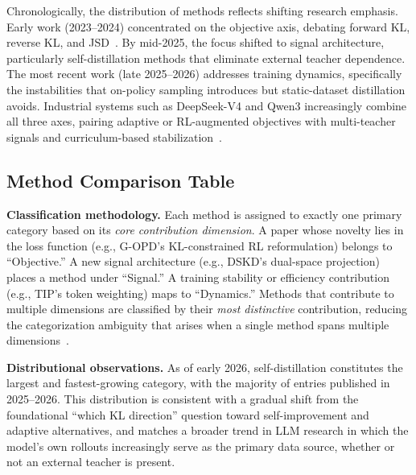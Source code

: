 \documentclass{article} %
\begin{document}
Chronologically, the distribution of methods reflects shifting research emphasis. Early work (2023--2024) concentrated on the objective axis, debating forward KL, reverse KL, and JSD~\citep{2306.13649,2306.08543}. By mid-2025, the focus shifted to signal architecture, particularly self-distillation methods that eliminate external teacher dependence. The most recent work (late 2025--2026) addresses training dynamics, specifically the instabilities that on-policy sampling introduces but static-dataset distillation avoids. Industrial systems such as DeepSeek-V4 and Qwen3 increasingly combine all three axes, pairing adaptive or RL-augmented objectives with multi-teacher signals and curriculum-based stabilization~\citep{2602.12125,2505.09388}.

\subsection{Method Comparison Table}

\textbf{Classification methodology.} Each method is assigned to exactly one primary category based on its \emph{core contribution dimension}. A paper whose novelty lies in the loss function (e.g., G-OPD's KL-constrained RL reformulation) belongs to ``Objective.'' A new signal architecture (e.g., DSKD's dual-space projection) places a method under ``Signal.'' A training stability or efficiency contribution (e.g., TIP's token weighting) maps to ``Dynamics.'' Methods that contribute to multiple dimensions are classified by their \emph{most distinctive} contribution, reducing the categorization ambiguity that arises when a single method spans multiple dimensions~\citep{2402.13116}.

\textbf{Distributional observations.} As of early 2026, self-distillation constitutes the largest and fastest-growing category, with the majority of entries published in 2025--2026. This distribution is consistent with a gradual shift from the foundational ``which KL direction'' question toward self-improvement and adaptive alternatives, and matches a broader trend in LLM research in which the model's own rollouts increasingly serve as the primary data source, whether or not an external teacher is present.
\end{document}
